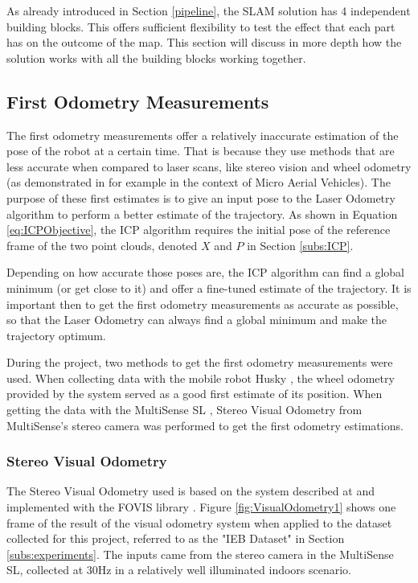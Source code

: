 \documentclass[11pt]{article}
\begin{document}
As already introduced in Section \ref{pipeline}, the SLAM solution has 4 independent building blocks. This offers sufficient flexibility to test the effect that each part has on the outcome of the map. This section will discuss in more depth how the solution works with all the building blocks working together. 
	 
	\subsection{First Odometry Measurements}

The first odometry measurements offer a relatively inaccurate estimation of the pose of the robot at a certain time. That is because they use methods that are less accurate when compared to laser scans, like stereo vision and wheel odometry (as demonstrated in \cite{achtelik2009stereo} for example in the context of Micro Aerial Vehicles). The purpose of these first estimates is to give an input pose to the Laser Odometry algorithm to perform a better estimate of the trajectory. As shown in Equation \ref{eq:ICPObjective}, the ICP algorithm requires the initial pose of the reference frame of the two point clouds, denoted $X$ and $P$ in Section \ref{subs:ICP}.

Depending on how accurate those poses are, the ICP algorithm can find a global minimum (or get close to it) and offer a fine-tuned estimate of the trajectory. It is important then to get the first odometry measurements as accurate as possible, so that the Laser Odometry can always find a global minimum and make the trajectory optimum.
	
During the project, two methods to get the first odometry measurements were used. When collecting data with the mobile robot Husky \cite{Husky}, the wheel odometry provided by the system served as a good first estimate of its position. When getting the data with the MultiSense SL \cite{multisense}, Stereo Visual Odometry from MultiSense's stereo camera was performed to get the first odometry estimations.
	
	\subsubsection*{Stereo Visual Odometry}

The Stereo Visual Odometry used is based on the system described at \cite{VisualOdometry} and implemented with the FOVIS library \cite{fovis}. Figure \ref{fig:VisualOdometry1} shows one frame of the result of the visual odometry system when applied to the dataset collected for this project, referred to as the "IEB Dataset" in Section \ref{subs:experiments}. The inputs came from the stereo camera in the MultiSense SL, collected at 30Hz in a relatively well illuminated indoors scenario.
	
\end{document}
